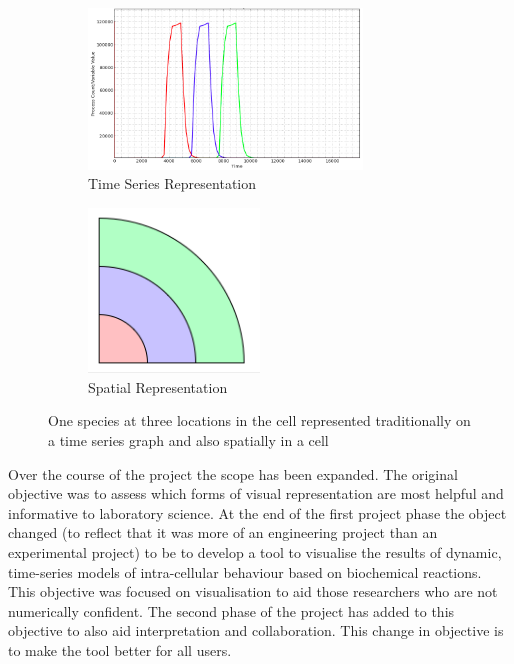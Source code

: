 \begin{figure}[h!]
    \centering
    \begin{subfigure}[b]{0.4\textwidth}
        \centering
        \includegraphics[width=0.8\textwidth]{images/asrc_graph_intro.png}
        \caption{Time Series Representation}
        \label{fig:asrc_graph_intro}
    \end{subfigure}
    \begin{subfigure}[b]{0.4\textwidth}
        \centering
        \includegraphics[width=0.5\textwidth]{images/asrc_cell_intro.png}
        \caption{Spatial Representation}
        \label{fig:asrc_cell_intro}
    \end{subfigure}
    \caption{One species at three locations in the cell represented traditionally on a time series graph and also spatially in a cell}
    \label{fig:asrc_intro}
\end{figure}


Over the course of the project the scope has been expanded.  The original objective was to assess which forms of visual representation are most helpful and informative to laboratory science.  At the end of the first project phase the object changed (to reflect that it was more of an engineering project than an experimental project) to be to develop a tool to visualise the results of dynamic, time-series models of intra-cellular behaviour based on biochemical reactions.  This objective was focused on visualisation to aid those researchers who are not numerically confident.  The second phase of the project has added to this objective to also aid interpretation and collaboration.  This change in objective is to make the tool better for all users.

